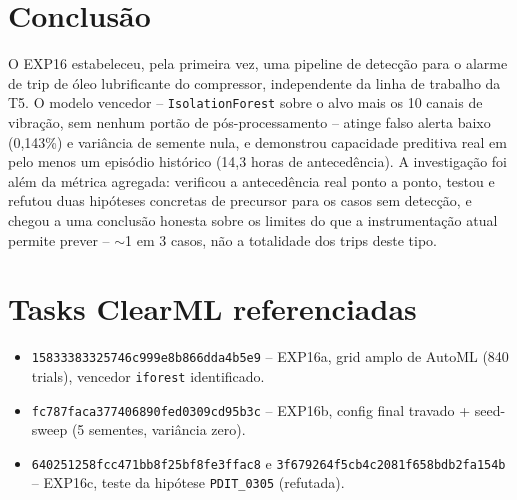 \documentclass[11pt,a4paper]{article}
\begin{document}
\section{Conclusão}

O EXP16 estabeleceu, pela primeira vez, uma pipeline de detecção para o
alarme de trip de óleo lubrificante do compressor, independente da linha
de trabalho da T5. O modelo vencedor -- \texttt{IsolationForest} sobre o
alvo mais os 10 canais de vibração, sem nenhum portão de pós-processamento
-- atinge falso alerta baixo (0,143\%) e variância de semente nula, e
demonstrou capacidade preditiva real em pelo menos um episódio histórico
(14,3 horas de antecedência). A investigação foi além da métrica agregada:
verificou a antecedência real ponto a ponto, testou e refutou duas
hipóteses concretas de precursor para os casos sem detecção, e chegou a
uma conclusão honesta sobre os limites do que a instrumentação atual
permite prever -- $\sim$1 em 3 casos, não a totalidade dos trips deste
tipo.

\section{Tasks ClearML referenciadas}

\begin{itemize}[leftmargin=1.4em]
  \item \texttt{15833383325746c999e8b866dda4b5e9} -- EXP16a, grid amplo de
  AutoML (840 trials), vencedor \texttt{iforest} identificado.
  \item \texttt{fc787faca377406890fed0309cd95b3c} -- EXP16b, config final
  travado + seed-sweep (5 sementes, variância zero).
  \item \texttt{640251258fcc471bb8f25bf8fe3ffac8} e
  \texttt{3f679264f5cb4c2081f658bdb2fa154b} -- EXP16c, teste da hipótese
  \texttt{PDIT\_0305} (refutada).
\end{itemize}
\end{document}
